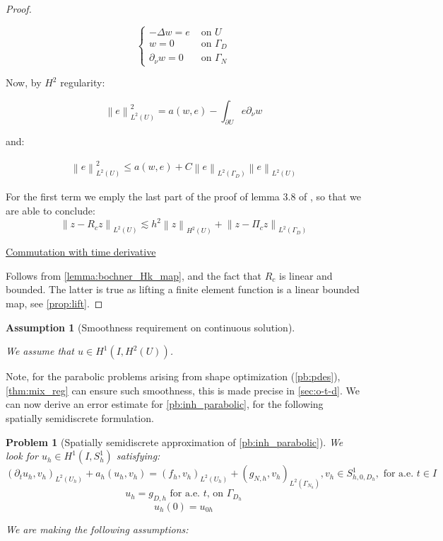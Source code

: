 \documentclass[english,a4paper,9pt,oneside]{scrbook}	%
\theoremstyle{break}
\newtheorem{ass}[equation]{Assumption}
\newtheorem{pb}[equation]{Problem}
\newenvironment{mproof}[1][\proofname]{%
  \begin{proof}[#1]$ $\par\nobreak\ignorespaces
}{%
  \end{proof}
}
\renewcommand*{\proofname}{Proof}
\theoremstyle{remark}
\newcommand{\norm}[1]{\left\lVert#1\right\rVert}
\begin{document}
\begin{appendices}
\begin{mproof}
$$
\left\{\begin{matrix}
-\Delta w = e & \text{ on } U \\ 
w = 0 & \text{ on } \Gamma_D \\ 
\partial_\nu w = 0 & \text{ on } \Gamma_N 
\end{matrix}\right.
$$

Now, by $H^2$ regularity:

$$\norm{e}^2_{L^2(U)} = a(w,e) - \int_{\partial U} e \partial_\nu w  $$

and:

\begin{align*}
\norm{e}^2_{L^2(U)} \leq a(w,e) + C \norm{e}_{L^2(\Gamma_D)}\norm{e}_{L^2( U)} 
\end{align*}

For the first term we emply the last part of the proof of lemma 3.8 of \cite{ranner}, so that we are able to conclude:
$$\norm{z-R_c z}_{L^2(U)}\lesssim h^2\norm{z}_{H^2(U)} + \norm{z-\Pi_c z}_{L^2(\Gamma_D)} $$

\underline{Commutation with time derivative}

Follows from \cref{lemma:bochner_Hk_map}, and the fact that $R_c$ is linear and bounded. The latter is true as lifting a finite element function is a linear bounded map, see \cref{prop:lift}.
\end{mproof}

\begin{ass}[Smoothness requirement on continuous solution]
\label{ass:smoothness_par_discr}

We assume that $u \in H^1(I, H^2(U))$.
\end{ass}

Note, for the parabolic problems arising from shape optimization (\cref{pb:pdes}), \cref{thm:mix_reg} can ensure such smoothness, this is made precise in \cref{sec:o-t-d}.
We can now derive an error estimate for \cref{pb:inh_parabolic}, for the following spatially semidiscrete formulation.

\begin{pb}[Spatially semidiscrete approximation of \cref{pb:inh_parabolic}]
\label{pb:inh_parabolic_discr}
We look for $u_h \in H^1(I, S^1_h)$ satisfying: 
$$(\partial_t u_h, v_h)_{L^2(U_h)} + a_h(u_h, v_h) = (f_h, v_h)_{L^2(U_h)} + (g_{N,h}, v_h)_{L^2(\Gamma_{N_h})}, v_h \in S^1_{h,0,D_h}, \text{ for a.e. }t\in I$$
$$u_h=g_{D,h}\text{ for a.e. }t \text{,  on } \Gamma_{D_h}$$
$$u_h(0)=u_{0h}$$

We are making the following assumptions:


\end{pb}
\end{appendices}
\end{document}
